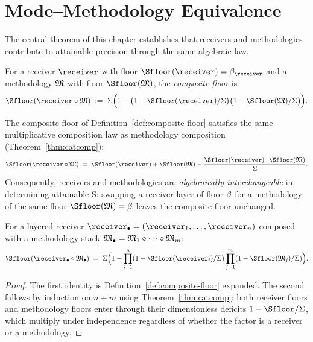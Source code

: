 \section{Mode--Methodology Equivalence}
\label{sec:mode-meth-equiv}

The central theorem of this chapter establishes that receivers and methodologies contribute to attainable precision through the same algebraic law.

\begin{definition}\label{def:composite-floor}
For a receiver $\receiver$ with floor $\Sfloor(\receiver) = \NoiseFloor_\receiver$ and a methodology $\mathfrak{M}$ with floor $\Sfloor(\Meth)$, the \emph{composite floor} is
\[
\Sfloor(\receiver \circ \Meth) \;:=\; \Sigma\Bigl(1 - \bigl(1 - \Sfloor(\receiver)/\Sigma\bigr)\bigl(1 - \Sfloor(\Meth)/\Sigma\bigr)\Bigr).
\]
\end{definition}

\begin{theorem}\label{thm:mode-meth-equiv}
The composite floor of Definition~\ref{def:composite-floor} satisfies the same multiplicative composition law as methodology composition (Theorem~\ref{thm:catcomp}):
\[
\Sfloor(\receiver \circ \Meth)
\;=\; \Sfloor(\receiver) + \Sfloor(\Meth)
    - \frac{\Sfloor(\receiver) \cdot \Sfloor(\Meth)}{\Sigma}.
\]
Consequently, receivers and methodologies are \emph{algebraically interchangeable} in determining attainable S: swapping a receiver layer of floor $\beta$ for a methodology of the same floor $\Sfloor(\Meth) = \NoiseFloor$ leaves the composite floor unchanged.

For a layered receiver $\receiver_\bullet = (\receiver_1, \ldots, \receiver_n)$ composed with a methodology stack $\mathfrak{M}_\bullet = \mathfrak{M}_1 \diamond \cdots \diamond \mathfrak{M}_m$:
\[
\Sfloor(\receiver_\bullet \circ \Meth_\bullet)
\;=\; \Sigma\Bigl(1 - \prod_{i=1}^{n}(1 - \Sfloor(\receiver_i)/\Sigma)
                       \prod_{j=1}^{m}(1 - \Sfloor(\Meth_j)/\Sigma)\Bigr).
\]
\end{theorem}

\begin{proof}
The first identity is Definition~\ref{def:composite-floor} expanded. The second follows by induction on $n + m$ using Theorem~\ref{thm:catcomp}: both receiver floors and methodology floors enter through their dimensionless deficits $1 - \Sfloor/\Sigma$, which multiply under independence regardless of whether the factor is a receiver or a methodology.
\end{proof}

